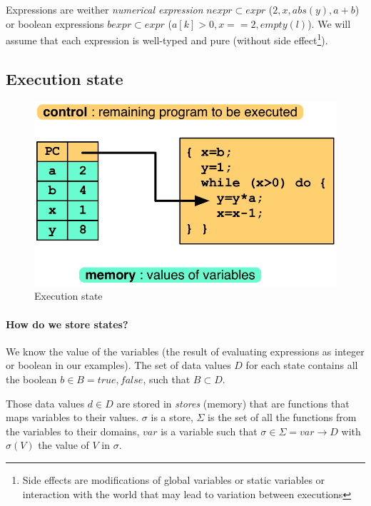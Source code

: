 \documentclass[12pt, a4paper]{book}
\begin{document}
Expressions are weither \textit{numerical expression} $nexpr \subset expr$
($2,x, abs(y), a+b$) or boolean expressions $bexpr \subset expr$
($a[k]>0, x==2, empty(l)$). We will assume that each expression is well-typed
and pure (without side effect\footnote{Side effects are modifications of global
variables or static variables or interaction with the world that may lead to
variation between executions}). \newline

\subsection{Execution state}
\label{sub:Execution state}

\begin{figure}[!ht]
    \includegraphics[width=\linewidth]{execution_state.png}
    \caption{Execution state}
\end{figure}

\paragraph{How do we store states?} We know the value of the variables (the
result of evaluating expressions as integer or boolean in our examples). The
set of data values $D$ for each state contains all the boolean
$b \in B = {true, false}$, such that $B \subset D$. \newline

Those data values $d \in D$ are stored in \textit{stores} (memory) that are
functions that maps variables to their values. $\sigma$ is a store, $\Sigma$ is
the set of all the functions from the variables to their domains, $var$ is a
variable such that $\sigma \in \Sigma = var \rightarrow D$ with $\sigma(V)$ the
value of $V$ in $\sigma$.
\end{document}
